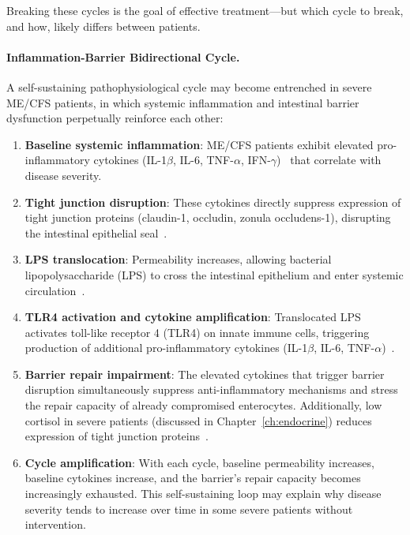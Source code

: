Breaking these cycles is the goal of effective treatment---but which cycle to break, and how, likely differs between patients.

\paragraph{Inflammation-Barrier Bidirectional Cycle.}

A self-sustaining pathophysiological cycle may become entrenched in severe ME/CFS patients, in which systemic inflammation and intestinal barrier dysfunction perpetually reinforce each other:

\begin{enumerate}
    \item \textbf{Baseline systemic inflammation}: ME/CFS patients exhibit elevated pro-inflammatory cytokines (IL-1$\beta$, IL-6, TNF-$\alpha$, IFN-$\gamma$)~\cite{Montoya2017} that correlate with disease severity.
    \item \textbf{Tight junction disruption}: These cytokines directly suppress expression of tight junction proteins (claudin-1, occludin, zonula occludens-1), disrupting the intestinal epithelial seal~\cite{GutPermeability2023}.
    \item \textbf{LPS translocation}: Permeability increases, allowing bacterial lipopolysaccharide (LPS) to cross the intestinal epithelium and enter systemic circulation~\cite{GutPermeability2023}.
    \item \textbf{TLR4 activation and cytokine amplification}: Translocated LPS activates toll-like receptor 4 (TLR4) on innate immune cells, triggering production of additional pro-inflammatory cytokines (IL-1$\beta$, IL-6, TNF-$\alpha$)~\cite{Junker2012}.
    \item \textbf{Barrier repair impairment}: The elevated cytokines that trigger barrier disruption simultaneously suppress anti-inflammatory mechanisms and stress the repair capacity of already compromised enterocytes. Additionally, low cortisol in severe patients (discussed in Chapter~\ref{ch:endocrine}) reduces expression of tight junction proteins~\cite{Papadopoulos2012HPA}.
    \item \textbf{Cycle amplification}: With each cycle, baseline permeability increases, baseline cytokines increase, and the barrier's repair capacity becomes increasingly exhausted. This self-sustaining loop may explain why disease severity tends to increase over time in some severe patients without intervention.
\end{enumerate}

